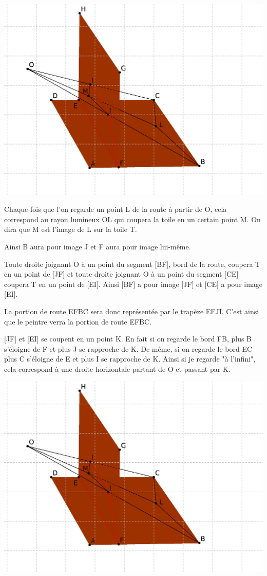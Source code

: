 \documentclass[a4paper, 12pt, twoside]{book}
\begin{document}
    
 \includegraphics[scale=1]{figures/peint.eps} 
   
    
    Chaque fois que l'on regarde un point L de la route à partir de O, cela correspond au rayon lumineux OL qui coupera la toile en un certain point M. On dira que M est l'image de L sur la toile T.
 

 
  Ainsi  B aura pour image J et F aura pour image lui-même.\
  
  
 Toute droite joignant O à un point du segment [BF], bord de la route, coupera T en un point de [JF] et toute droite joignant O à un point du segment [CE] coupera T en un point de [EI]. Ainsi [BF] a pour image  [JF] et [CE] a pour image [EI]. \
 
  La portion de route EFBC sera donc représentée par le trapèze EFJI. C'est ainsi que le peintre verra la portion de route EFBC.\
  
  
   [JF] et [EI] se coupent en un point K. En fait si on regarde le bord FB, plus B s'éloigne de F et plus J se rapproche de K. De même, si on regarde le bord EC plus C s'éloigne de E et plus I se rapproche de K. Ainsi si je regarde "à l'infini", cela correspond à une droite horizontale partant de O et passant par K. \
   
 \includegraphics[scale=1]{figures/peint.eps} 
   
\end{document}
